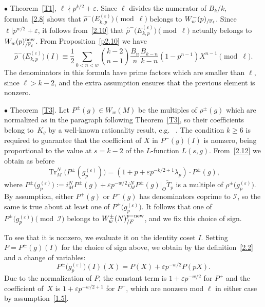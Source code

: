 \documentclass{amsart}
\theoremstyle{plain}
\theoremstyle{definition}
\numberwithin{equation}{section}
\def\tr{\operatorname{Tr}}\def\id{\mathrm{Id}}
\def\I{\mathcal{I}} \def\J{\mathcal{J}} \def\LL{\mathcal{L}}
\def\e{\varepsilon} \def\DD{\Delta} \def\G{\Gamma}\def\om{\omega}
\newcommand{\wT}{\widetilde{T}}
\renewcommand{\wr}{\widehat{\rho}}
\begin{document}
$\bullet$ Theorem~\ref{T1}, $\ell\nmid p^{k/2}+\e$. 
Since $\ell$ divides the numerator of $B_k/k$, formula~\eqref{2.8} 
shows that
$\wr^-\big( E_{k,p}^{(\e)}\big)\pmod \ell$ 
belongs to $W_{w}^-(p)_{/ \mathbb{F}_\ell}$. Since $\ell|p^{w/2}+\e$, it follows 
from~\eqref{2.10} that $\wr^-\big( E_{k,p}^{(\e)}\big)\!\! \pmod\ell$ actually belongs 
to $W_{w}(p)^{\mathrm{new}}_{/ \mathbb{F}_\ell}$. From Proposition~\ref{p2.10}  we have 
\[
\wr^-\big(E_{k,p}^{(\e)}\big)(I) \equiv  \frac 12
 \sum_{0<n<w} \binom{k-2}{n-1} \frac{B_{n}}{n}\frac{B_{k-n}}{k-n}(1-p^{n-1}) X^{n-1}
\pmod \ell .
\]
The denominators in this formula have prime factors which are smaller than 
$\ell$, since $\ell>k-2$, and the extra assumption ensures that the 
previous element is nonzero. 

$\bullet$ Theorem~\ref{T3}. Let $P^\pm(g)\in W_w(M)$ 
be the multiples of $\rho^\pm(g)$ which are normalized as in the paragraph
following Theorem~\ref{T3}, so their coefficients belong to~$K_g$ by  
a well-known rationality result, e.g. ~\cite[Prop. 5.11]{PP}.
The condition $k\ge 6$ is required to guarantee that 
the coefficient of $X$ in $P^-(g)(I)$ is nonzero, being proportional to the 
value at $s=k-2$ of the $L$-function $L(s,g)$. 
From~\eqref{2.12} we obtain as before
\[\tr^N_M \big( P^\pm(g_p^{(\e)}) \big)= (1+p+\e p^{-k/2+1}\lambda_p)\cdot P^\pm(g),\] 
where $P^\pm\big(g_p^{(\e)}\big):= i_M^N P^\pm(g)+\e p^{-w/2}i_M^NP^\pm (g)|_\Theta \wT_p$  
is a multiple of $\rho^{\pm}\big(g_p^{(\e)}\big)$. By assumption, either 
$P^+(g)$ or $P^-(g)$ has denominators coprime to $\I$, so the same is 
true about at least one of $P^\pm\big(g_p^{(\e)}\big)$. It follows that one of
$P^\pm\big(g_p^{(\e)}\big)\pmod \I$ belongs to  $W_w^\pm(N)^{p-\mathrm{new}}_{/F}$, and we fix
this choice of sign.

To see that it is nonzero, we evaluate it on the identity coset $I$. 
Setting $P=P^\pm(g)(I)$ for the choice of sign above, we obtain by 
the definition~\eqref{2.2} and a change of variables: 
$$P^\pm\big(g_p^{(\e)}\big)(I)(X)=P(X)+\e p^{-w/2} P(pX). $$ 
Due to the normalization of $P$, the constant term is $1+\e p^{-w/2}$ for 
$P^+$ and the coefficient of~$X$ is $1+\e p^{-w/2+1}$ for $P^-$, which are 
nonzero mod $\ell$ in either case by assumption~\eqref{1.5}. 
\end{document}
